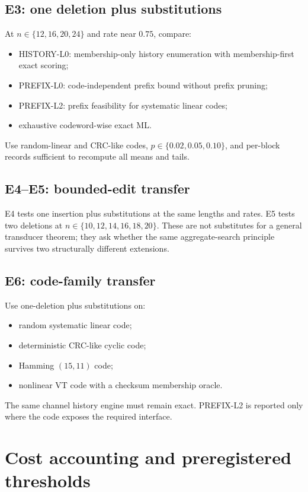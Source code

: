 \documentclass[11pt]{article}
\begin{document}
\subsection{E3: one deletion plus substitutions}
At $n\in\{12,16,20,24\}$ and rate near $0.75$, compare:
\begin{itemize}
\item HISTORY-L0: membership-only history enumeration with membership-first exact scoring;
\item PREFIX-L0: code-independent prefix bound without prefix pruning;
\item PREFIX-L2: prefix feasibility for systematic linear codes;
\item exhaustive codeword-wise exact ML.
\end{itemize}
Use random-linear and CRC-like codes, $p\in\{0.02,0.05,0.10\}$, and per-block records sufficient to recompute all means and tails.

\subsection{E4--E5: bounded-edit transfer}
E4 tests one insertion plus substitutions at the same lengths and rates. E5 tests two deletions at $n\in\{10,12,14,16,18,20\}$. These are not substitutes for a general transducer theorem; they ask whether the same aggregate-search principle survives two structurally different extensions.

\subsection{E6: code-family transfer}
Use one-deletion plus substitutions on:
\begin{itemize}
\item random systematic linear code;
\item deterministic CRC-like cyclic code;
\item Hamming $(15,11)$ code;
\item nonlinear VT code with a checksum membership oracle.
\end{itemize}
The same channel history engine must remain exact. PREFIX-L2 is reported only where the code exposes the required interface.

\section{Cost accounting and preregistered thresholds}
\end{document}
